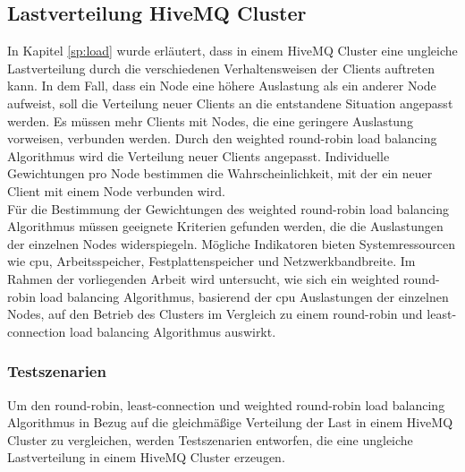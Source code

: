 \subsection{Lastverteilung HiveMQ Cluster} \label{ss:load-distribution}
In Kapitel \ref{sp:load} wurde erläutert, dass in einem HiveMQ Cluster eine ungleiche Lastverteilung durch die verschiedenen Verhaltensweisen der Clients auftreten kann.
In dem Fall, dass ein Node eine höhere Auslastung als ein anderer Node aufweist, soll die Verteilung neuer Clients an die entstandene Situation angepasst werden.
Es müssen mehr Clients mit Nodes, die eine geringere Auslastung vorweisen, verbunden werden.
Durch den weighted round-robin load balancing Algorithmus wird die Verteilung neuer Clients angepasst. Individuelle Gewichtungen pro Node bestimmen die Wahrscheinlichkeit, mit der ein neuer Client mit einem Node verbunden wird.
\\
Für die Bestimmung der Gewichtungen des weighted round-robin load balancing Algorithmus müssen geeignete Kriterien gefunden werden, die die Auslastungen der einzelnen Nodes widerspiegeln.
Mögliche Indikatoren bieten Systemressourcen wie \ac{cpu}, Arbeitsspeicher, Festplattenspeicher und Netzwerkbandbreite.
Im Rahmen der vorliegenden Arbeit wird untersucht, wie sich ein weighted round-robin load balancing Algorithmus, basierend der \ac{cpu} Auslastungen der einzelnen Nodes, auf den Betrieb des Clusters im Vergleich zu einem round-robin und least-connection load balancing Algorithmus auswirkt.

\subsubsection{Testszenarien} \label{ss:test}
Um den round-robin, least-connection und weighted round-robin load balancing Algorithmus in Bezug auf die gleichmä{\ss}ige Verteilung der Last in einem HiveMQ Cluster zu vergleichen, werden Testszenarien entworfen, die eine ungleiche Lastverteilung in einem HiveMQ Cluster erzeugen.

